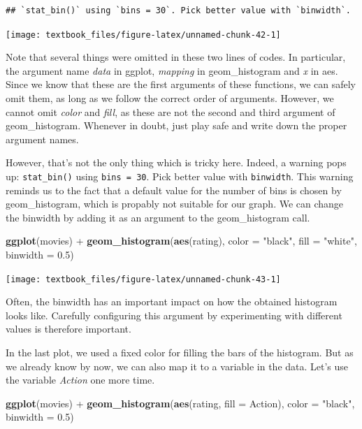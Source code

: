 \documentclass[]{tufte-book}
\newenvironment{Shaded}{}{}
\newcommand{\DataTypeTok}[1]{\textcolor[rgb]{0.56,0.13,0.00}{#1}}
\newcommand{\FloatTok}[1]{\textcolor[rgb]{0.25,0.63,0.44}{#1}}
\newcommand{\KeywordTok}[1]{\textcolor[rgb]{0.00,0.44,0.13}{\textbf{#1}}}
\newcommand{\NormalTok}[1]{#1}
\newcommand{\OperatorTok}[1]{\textcolor[rgb]{0.40,0.40,0.40}{#1}}
\newcommand{\StringTok}[1]{\textcolor[rgb]{0.25,0.44,0.63}{#1}}
\begin{document}
\begin{verbatim}
## `stat_bin()` using `bins = 30`. Pick better value with `binwidth`.
\end{verbatim}

\texttt{[image: textbook\_files/figure-latex/unnamed-chunk-42-1]}

Note that several things were omitted in these two lines of codes. In particular, the argument name \emph{data} in ggplot, \emph{mapping} in geom\_histogram and \emph{x} in aes. Since we know that these are the first arguments of these functions, we can safely omit them, as long as we follow the correct order of arguments. However, we cannot omit \emph{color} and \emph{fill}, as these are not the second and third argument of geom\_histogram. Whenever in doubt, just play safe and write down the proper argument names.

However, that's not the only thing which is tricky here. Indeed, a warning pops up: \texttt{stat\_bin()} using \texttt{bins\ =\ 30}. Pick better value with \texttt{binwidth}. This warning reminds us to the fact that a default value for the number of bins is chosen by geom\_histogram, which is propably not suitable for our graph. We can change the binwidth by adding it as an argument to the geom\_histogram call.

\begin{Shaded}
\begin{Highlighting}[]
\KeywordTok{ggplot}\NormalTok{(movies) }\OperatorTok{+}
\StringTok{    }\KeywordTok{geom_histogram}\NormalTok{(}\KeywordTok{aes}\NormalTok{(rating), }\DataTypeTok{color =} \StringTok{"black"}\NormalTok{, }\DataTypeTok{fill =} \StringTok{"white"}\NormalTok{, }\DataTypeTok{binwidth =} \FloatTok{0.5}\NormalTok{)}
\end{Highlighting}
\end{Shaded}

\texttt{[image: textbook\_files/figure-latex/unnamed-chunk-43-1]}

Often, the binwidth has an important impact on how the obtained histogram looks like. Carefully configuring this argument by experimenting with different values is therefore important.

In the last plot, we used a fixed color for filling the bars of the histogram. But as we already know by now, we can also map it to a variable in the data. Let's use the variable \emph{Action} one more time.

\begin{Shaded}
\begin{Highlighting}[]
\KeywordTok{ggplot}\NormalTok{(movies) }\OperatorTok{+}
\StringTok{    }\KeywordTok{geom_histogram}\NormalTok{(}\KeywordTok{aes}\NormalTok{(rating, }\DataTypeTok{fill =}\NormalTok{ Action), }\DataTypeTok{color =} \StringTok{"black"}\NormalTok{, }\DataTypeTok{binwidth =} \FloatTok{0.5}\NormalTok{)}
\end{Highlighting}
\end{Shaded}
\end{document}
